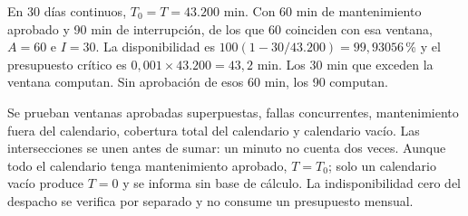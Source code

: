 En 30 días continuos, $T_0=T=\text{43.200}$ min. Con 60 min de mantenimiento aprobado y 90 min de interrupción, de los que 60 coinciden con esa ventana, $A=60$ e $I=30$. La disponibilidad es $100(1-30/\text{43.200})=99,93056$\,\% y el presupuesto crítico es $0,001\times\text{43.200}=43,2$ min. Los 30 min que exceden la ventana computan. Sin aprobación de esos 60 min, los 90 computan.

Se prueban ventanas aprobadas superpuestas, fallas concurrentes, mantenimiento fuera del calendario, cobertura total del calendario y calendario vacío. Las intersecciones se unen antes de sumar: un minuto no cuenta dos veces. Aunque todo el calendario tenga mantenimiento aprobado, $T=T_0$; solo un calendario vacío produce $T=0$ y se informa sin base de cálculo. La indisponibilidad cero del despacho se verifica por separado y no consume un presupuesto mensual.
